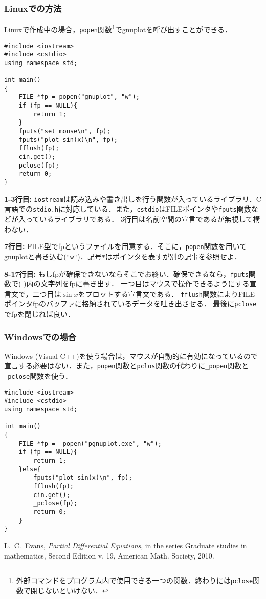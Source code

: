 \subsubsection{ Linuxでの方法}
Linuxで作成中の場合，\texttt{popen}関数\footnote{外部コマンドをプログラム内で使用できる一つの関数．終わりには\texttt{pclose}関数で閉じないといけない．}でgnuplotを呼び出すことができる．
\begin{lstlisting}[caption=C++のコード内からgnuplotを呼び出し$\sin x$を描く]
#include <iostream>
#include <cstdio>
using namespace std;

int main()
{
	FILE *fp = popen("gnuplot", "w");
	if (fp == NULL){
		return 1;
	}
	fputs("set mouse\n", fp);
	fputs("plot sin(x)\n", fp);
	fflush(fp);
	cin.get();
	pclose(fp);
	return 0;
}
\end{lstlisting}

\textbf{1-3行目:}
\texttt{iostream}は読み込みや書き出しを行う関数が入っているライブラリ．C言語での\texttt{stdio.h}に対応している．また，\texttt{cstdio}はFILEポインタや\texttt{fputs}関数などが入っているライブラリである．
3行目は名前空間の宣言であるが無視して構わない．

\textbf{7行目:}
FILE型でfpというファイルを用意する．そこに，\texttt{popen}関数を用いてgnuplotと書き込む(\texttt{"w"})．記号\texttt{*}はポインタを表すが別の記事を参照せよ．

\textbf{8-17行目:}
もしfpが確保できないならそこでお終い．確保できるなら，\texttt{fputs}関数で( )内の文字列をfpに書き出す．
一つ目はマウスで操作できるようにする宣言文で，二つ目は$\sin x$をプロットする宣言文である．
\texttt{fflush}関数によりFILEポインタfpのバッファに格納されているデータを吐き出させる．
最後に\texttt{pclose}でfpを閉じれば良い．


\subsubsection{ Windowsでの場合}
Windows (Visual C++)を使う場合は，マウスが自動的に有効になっているので宣言する必要はない．また，\texttt{popen}関数と\texttt{pclos}関数の代わりに\texttt{\_popen}関数と\texttt{\_pclose}関数を使う．
\begin{lstlisting}[caption=Visual C++のコード内からgnuplotを呼び出し$\sin x$を描く]
#include <iostream>
#include <cstdio>
using namespace std;

int main()
{
	FILE *fp = _popen("pgnuplot.exe", "w");
	if (fp == NULL){
		return 1;
	}else{
		fputs("plot sin(x)\n", fp);
		fflush(fp);
		cin.get();
		_pclose(fp);
		return 0;
	}
}
\end{lstlisting}



\begin{thebibliography}{99}
   L.~C.~Evans, \emph{Partial Differential Equations}, in the series Graduate studies in mathematics,
Second Edition v. 19, American Math. Society, 2010.
  \end{thebibliography}